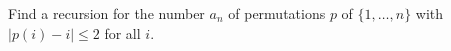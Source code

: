 Find a recursion for the number $a_n$ of permutations $p$ of $\{1, \ldots, n\}$ with $|p(i) - i| \leq 2$ for all $i$.
